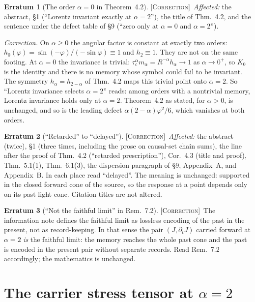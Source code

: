 \documentclass[10pt]{article}
\theoremstyle{definition}
\newtheorem{erratum}{Erratum}
\newcommand{\Correction}{\textup{\textsc{[Correction]}}\ }
\begin{document}
\begin{erratum}[The order $\alpha=0$ in Theorem~4.2]\label{er:alpha0}
\Correction \emph{Affected:} the abstract, \S1 (``Lorentz invariant exactly at $\alpha=2$''), the title of Thm.~4.2, and the sentence under the defect table of \S9 (``zero only at $\alpha=0$ and $\alpha=2$'').

\emph{Correction.} On $\alpha\ge0$ the angular factor is constant at exactly two orders: $h_0(\varphi)=\sin(-\varphi)/(-\sin\varphi)\equiv1$ and $h_2\equiv1$. They are not on the same footing. At $\alpha=0$ the invariance is trivial: $\tau_c^{\alpha}m_\alpha=R^{-\alpha}h_\alpha\to1$ as $\alpha\to0^+$, so $K_0$ is the identity and there is no memory whose symbol could fail to be invariant. The symmetry $h_\alpha=h_{2-\alpha}$ of Thm.~4.2 maps this trivial point onto $\alpha=2$. So ``Lorentz invariance selects $\alpha=2$'' reads: among orders with a nontrivial memory, Lorentz invariance holds only at $\alpha=2$. Theorem~4.2 as stated, for $\alpha>0$, is unchanged, and so is the leading defect $\alpha(2-\alpha)\varphi^2/6$, which vanishes at both orders.
\end{erratum}

\begin{erratum}[``Retarded'' to ``delayed'']\label{er:delayed}
\Correction \emph{Affected:} the abstract (twice), \S1 (three times, including the prose on causal-set chain sums), the line after the proof of Thm.~4.2 (``retarded prescription''), Cor.~4.3 (title and proof), Thm.~5.1(1), Thm.~6.1(3), the dispersion paragraph of \S9, Appendix~A, and Appendix~B. In each place read ``delayed''. The meaning is unchanged: supported in the closed forward cone of the source, so the response at a point depends only on its past light cone. Citation titles are not altered.
\end{erratum}

\begin{erratum}[``Not the faithful limit'' in Rem.~7.2]\label{er:faithful}
\Correction The information note defines the faithful limit as lossless encoding of the past in the present, not as record-keeping. In that sense the pair $(J,\partial_tJ)$ carried forward at $\alpha=2$ \emph{is} the faithful limit: the memory reaches the whole past cone and the past is encoded in the present pair without separate records. Read Rem.~7.2 accordingly; the mathematics is unchanged.
\end{erratum}

\section{The carrier stress tensor at \texorpdfstring{$\alpha=2$}{alpha = 2}}\label{s:stress}
\end{document}
